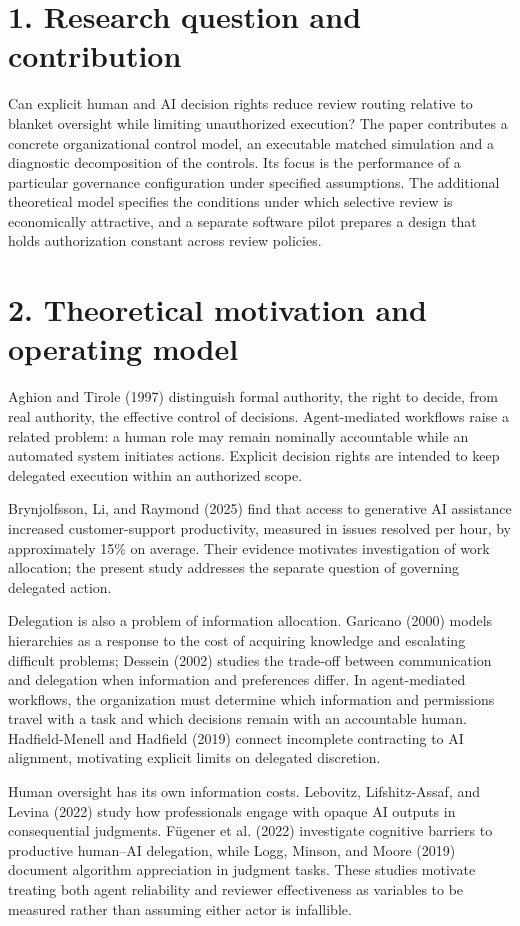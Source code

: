 \documentclass[11pt,letterpaper]{article}
\begin{document}
\section*{1. Research question and contribution}
Can explicit human and AI decision rights reduce review routing relative to blanket oversight while limiting unauthorized execution? The paper contributes a concrete organizational control model, an executable matched simulation and a diagnostic decomposition of the controls. Its focus is the performance of a particular governance configuration under specified assumptions. The additional theoretical model specifies the conditions under which selective review is economically attractive, and a separate software pilot prepares a design that holds authorization constant across review policies.

\section*{2. Theoretical motivation and operating model}
Aghion and Tirole (1997) distinguish formal authority, the right to decide, from real authority, the effective control of decisions. Agent-mediated workflows raise a related problem: a human role may remain nominally accountable while an automated system initiates actions. Explicit decision rights are intended to keep delegated execution within an authorized scope.

Brynjolfsson, Li, and Raymond (2025) find that access to generative AI assistance increased customer-support productivity, measured in issues resolved per hour, by approximately 15\% on average. Their evidence motivates investigation of work allocation; the present study addresses the separate question of governing delegated action.

Delegation is also a problem of information allocation. Garicano (2000) models hierarchies as a response to the cost of acquiring knowledge and escalating difficult problems; Dessein (2002) studies the trade-off between communication and delegation when information and preferences differ. In agent-mediated workflows, the organization must determine which information and permissions travel with a task and which decisions remain with an accountable human. Hadfield-Menell and Hadfield (2019) connect incomplete contracting to AI alignment, motivating explicit limits on delegated discretion.

Human oversight has its own information costs. Lebovitz, Lifshitz-Assaf, and Levina (2022) study how professionals engage with opaque AI outputs in consequential judgments. Fügener et al. (2022) investigate cognitive barriers to productive human--AI delegation, while Logg, Minson, and Moore (2019) document algorithm appreciation in judgment tasks. These studies motivate treating both agent reliability and reviewer effectiveness as variables to be measured rather than assuming either actor is infallible.
\end{document}
